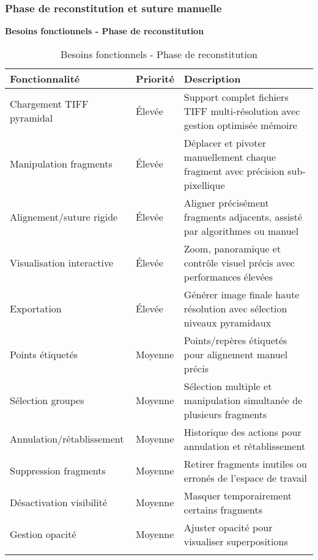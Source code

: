 \documentclass[12pt,a4paper]{report}
\begin{document}
\subsubsection{Phase de reconstitution et suture manuelle}

\vspace{1em}
\begin{center}
\textbf{\large Besoins fonctionnels - Phase de reconstitution}
\end{center}
\vspace{0.5em}

\begin{longtable}{|p{3.5cm}|p{1.5cm}|p{9cm}|}
\hline
\rowcolor{TableHeaderColor}
\textbf{Fonctionnalité} & \textbf{Priorité} & \textbf{Description} \\
\hline
\endhead

Chargement TIFF pyramidal & Élevée & Support complet fichiers TIFF multi-résolution avec gestion optimisée mémoire \\
\hline

Manipulation fragments & Élevée & Déplacer et pivoter manuellement chaque fragment avec précision sub-pixellique \\
\hline

Alignement/suture rigide & Élevée & Aligner précisément fragments adjacents, assisté par algorithmes ou manuel \\
\hline

Visualisation interactive & Élevée & Zoom, panoramique et contrôle visuel précis avec performances élevées \\
\hline

Exportation & Élevée & Générer image finale haute résolution avec sélection niveaux pyramidaux \\
\hline

Points étiquetés & Moyenne & Points/repères étiquetés pour alignement manuel précis \\
\hline

Sélection groupes & Moyenne & Sélection multiple et manipulation simultanée de plusieurs fragments \\
\hline

Annulation/rétablissement & Moyenne & Historique des actions pour annulation et rétablissement \\
\hline

Suppression fragments & Moyenne & Retirer fragments inutiles ou erronés de l'espace de travail \\
\hline

Désactivation visibilité & Moyenne & Masquer temporairement certains fragments \\
\hline

Gestion opacité & Moyenne & Ajuster opacité pour visualiser superpositions \\
\hline

\caption{Besoins fonctionnels - Phase de reconstitution}
\end{longtable}
\end{document}
